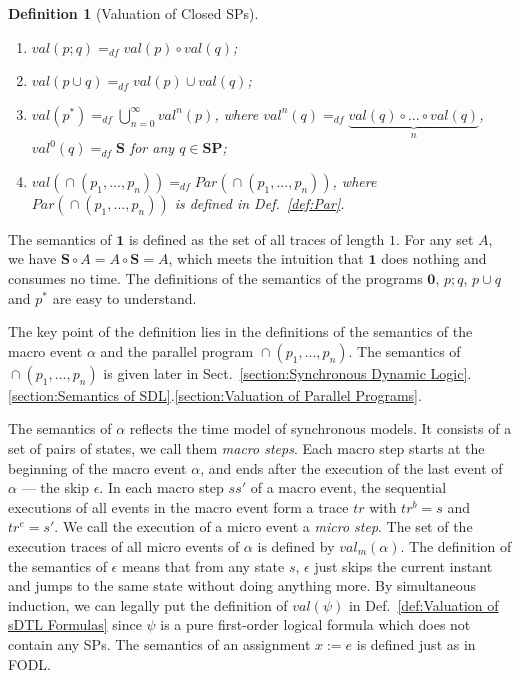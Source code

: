 \documentclass{fcs}
\newtheorem{mydef}{Definition}[section]
\newcommand{\bff}[1]{\mathbf{#1}}
\newcommand{\noth}[0]{\mathbf{1}}
\newcommand{\halt}[0]{\mathbf{0}}
\newcommand{\SP}[0]{\mathbf{SP}}
\newcommand{\Cl}[0]{\mathit{Cl}}
\newcommand{\val}[0]{\mathit{val}}
\newcommand{\Par}[0]{\mathit{Par}}
\DeclareMathOperator{\seq}{;}
\DeclareMathOperator{\cho}{\cup}
\DeclareMathOperator{\para}{\cap}
\newcommand{\dddef}[0]{=_{df}}
\begin{document}
\begin{mydef}[Valuation of Closed SPs]
\begin{enumerate}
		\fi
		\item $\val(p\seq q)\dddef \val(p)\circ \val(q)$;
		\item $\val(p\cho q)\dddef \val(p)\cup \val(q)$;
		\item $\val(p^*) \dddef \bigcup^{\infty}_{n=0}\val^n(p)$, where $\val^n(q) \dddef \underbrace{\val(q)\circ ...\circ\val(q)}_{n}$, $\val^0(q)\dddef \bff{S}$
	for any $q\in \SP$;	
		
		\item $\val(\para(p_1,...,p_n))\dddef \Par(\para(p_1,...,p_n))$, where $\Par(\para(p_1,...,p_n))$ is defined in Def.~\ref{def:Par}.
	\end{enumerate}
	
\end{mydef}

The semantics of $\noth$ is defined as the set of all traces of length $1$.
For any set $A$, we have $\bff{S}\circ A = A\circ \bff{S} = A$, which meets the intuition that $\noth$ does nothing and consumes no time.
The definitions of the semantics of the programs $\halt$, $p;q$, $p\cup q$ and $p^*$ are easy to understand.

The key point of the definition lies in the definitions of the semantics of the macro event $\alpha$ and the parallel program $\para(p_1,...,p_n)$.
The semantics of $\para(p_1,...,p_n)$ is given later in Sect.~\ref{section:Synchronous Dynamic Logic}.\ref{section:Semantics of SDL}.\ref{section:Valuation of Parallel Programs}.

The semantics of $\alpha$ reflects the time model of synchronous models.
It consists of a set of pairs of states, we call them \emph{macro steps}.
Each macro step starts at the beginning of the macro event $\alpha$, and ends after the execution of the last event of $\alpha$ --- the skip $\epsilon$.
In each macro step $ss'$ of a macro event, the sequential executions of all events in the macro event form a trace $tr$ with $tr^b = s$ and $tr^e = s'$.
We call the execution of a micro event a \emph{micro step}.
The set of the execution traces of all micro events of $\alpha$ is defined by $\val_m(\alpha)$.
The definition of the semantics of $\epsilon$ means that from any state $s$, $\epsilon$ just skips the current instant and jumps to the same state without doing anything more.
By simultaneous induction, we can legally put the definition of $\val(\psi)$ in Def.~\ref{def:Valuation of sDTL Formulas} since $\psi$ is a pure first-order logical formula which does not contain any SPs.
The semantics of an assignment $x:=e$ is defined just as in FODL.
\end{document}
